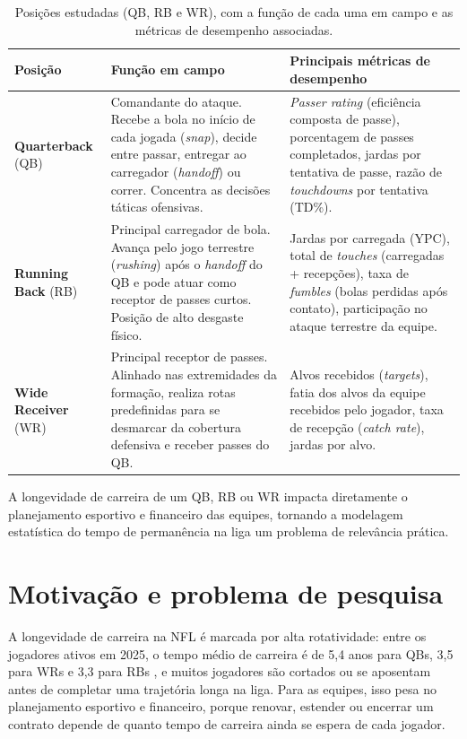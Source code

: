 \begin{table}[H]
\centering
\caption{Posições estudadas (QB, RB e WR), com a função de cada uma em campo e as métricas de desempenho associadas.}
\label{tab:posicoes_nfl}
\renewcommand{\arraystretch}{1.75}
\footnotesize
\begin{tabular}{@{}p{2.3cm} p{5.2cm} p{6.2cm}@{}}
\toprule
\textbf{Posição} & \textbf{Função em campo} & \textbf{Principais métricas de desempenho} \\
\midrule
\textbf{Quarterback} (QB) &
Comandante do ataque. Recebe a bola no início de cada jogada (\textit{snap}), decide entre passar, entregar ao carregador (\textit{handoff}) ou correr. Concentra as decisões táticas ofensivas. &
\textit{Passer rating} (eficiência composta de passe), porcentagem de passes completados, jardas por tentativa de passe, razão de \textit{touchdowns} por tentativa (TD\%). \\
\addlinespace[10pt]
\textbf{Running Back} (RB) &
Principal carregador de bola. Avança pelo jogo terrestre (\textit{rushing}) após o \textit{handoff} do QB e pode atuar como receptor de passes curtos. Posição de alto desgaste físico. &
Jardas por carregada (YPC), total de \textit{touches} (carregadas + recepções), taxa de \textit{fumbles} (bolas perdidas após contato), participação no ataque terrestre da equipe. \\
\addlinespace[10pt]
\textbf{Wide Receiver} (WR) &
Principal receptor de passes. Alinhado nas extremidades da formação, realiza rotas predefinidas para se desmarcar da cobertura defensiva e receber passes do QB. &
Alvos recebidos (\textit{targets}), fatia dos alvos da equipe recebidos pelo jogador, taxa de recepção (\textit{catch rate}), jardas por alvo. \\
\bottomrule
\end{tabular}
\end{table}

A longevidade de carreira de um QB, RB ou WR impacta diretamente o planejamento esportivo e financeiro das equipes, tornando a modelagem estatística do tempo de permanência na liga um problema de relevância prática.


\section{Motivação e problema de pesquisa}
\label{sec:motivacao}

A longevidade de carreira na NFL é marcada por alta rotatividade: entre os jogadores ativos em 2025, o tempo médio de carreira é de 5,4 anos para QBs, 3,5 para WRs e 3,3 para RBs \citep{statista_nfl_career}, e muitos jogadores são cortados ou se aposentam antes de completar uma trajetória longa na liga. Para as equipes, isso pesa no planejamento esportivo e financeiro, porque renovar, estender ou encerrar um contrato depende de quanto tempo de carreira ainda se espera de cada jogador.

